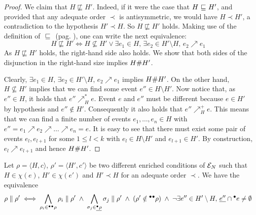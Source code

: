 \begin{proof}
We claim that $H \not\sqsubseteq H'$.  Indeed, if it were the case that $H
{\ \sqsubseteq \ } H'$, and provided that any adequate order $\prec$ is antisymmetric, we
would have $H \prec H'$, a contradiction to the hypothesis $H' \prec H$.  So $H
\not\sqsubseteq H'$ holds.  Making use of the definition of ${\ \sqsubseteq \ }$ (pag.
), one can write the next equivalence: $$H \not\sqsubseteq H'
\iff H \not\subseteq H' \lor \exists e_1 \in H,\, \exists e_2 \in H' \setminus
H,\, e_2 \nearrow e_1$$  As $H \not\sqsubseteq H'$ holds, the right-hand side
also holds.  We show that both sides of the disjunction in the right-hand size
implies $H \mathord{\#} H'$.

Clearly, $\exists e_1 \in H,\, \exists e_2 \in H' \setminus H,\, e_2 \nearrow
e_1$ implies $H \mathord{\#} H'$.  On the other hand, $H \not\subseteq H'$ implies
that we can find some event $e'' \in H \setminus H'$.  Now notice that, as $e''
\in H$, it holds that $e'' \nearrow^*_H e$.  Event $e$ and $e''$ must be
different because $e \in H'$ by hypothesis and $e'' \notin H'$.  Consequently
it also holds that $e'' \nearrow^+_H e$.  This means that we can find a finite
number of events $e_1, \ldots, e_n \in H$ with $e'' = e_1 \nearrow e_2 \nearrow
\ldots \nearrow e_n = e$.  It is easy to see that there must exist some pair of
events $e_l, e_{l+1}$ for some $1 \le l < k$ with $e_l \in H \setminus H'$ and
$e_{l+1} \in H'$.  By construction, $e_l \nearrow e_{l+1}$ and hence $H \mathord{\#}
H'$.
\end{proof}

\setcounter{theorem}{16}
\begin{theorem}
Let $\rho = \langle H, c \rangle$, $\rho' = \langle H', c' \rangle$ be two
different enriched conditions of $\mathcal{E}_{N}$ such that $H \in \chi(e)$, $H' \in
\chi(e')$ and $H' \prec H$ for an adequate order $\prec$.  We have the
equivalence $$\rho \parallel \rho' \iff \bigwedge_{\rho_i \in {}^\bullet{}^\bullet\rho}
\rho_i \parallel \rho' \; \land \; \bigwedge_{\sigma_j \in \underline{{}^\bullet\rho}}
\sigma_j \parallel \rho' \; \land \; (\rho' \notin {}^\bullet{}^\bullet\rho) \; \land \;
\lnot \exists e'' \in H' \setminus H,\, \underline{e''} \cap {}^\bullet e \not=
\emptyset$$
\end{theorem}

